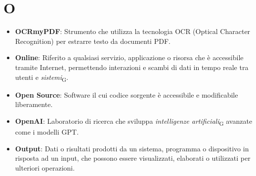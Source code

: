 \section{O}
\begin{itemize}
    \item \textbf{OCRmyPDF}: Strumento che utilizza la tecnologia OCR (Optical Character Recognition) per estrarre testo da documenti PDF.
    \item \textbf{Online}: Riferito a qualsiasi servizio, applicazione o risorsa che è accessibile tramite Internet, permettendo interazioni e scambi di dati in tempo reale tra utenti e \textit{sistemi}\textsubscript{G}.
    \item \textbf{Open Source}: Software il cui codice sorgente è accessibile e modificabile liberamente.
    \item \textbf{OpenAI}: Laboratorio di ricerca che sviluppa \textit{intelligenze artificiali}\textsubscript{G} avanzate come i modelli GPT.
    \item \textbf{Output}: Dati o risultati prodotti da un sistema, programma o dispositivo in risposta ad un input, che possono essere visualizzati, elaborati o utilizzati per ulteriori operazioni.
\end{itemize}
